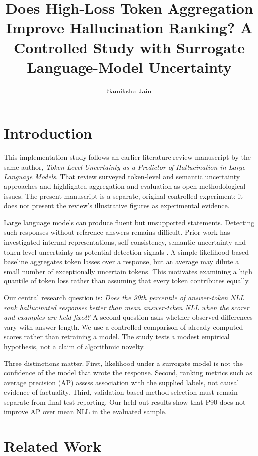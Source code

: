 \documentclass[manuscript,screen]{acmart}
\title{Does High-Loss Token Aggregation Improve Hallucination Ranking? A Controlled Study with Surrogate Language-Model Uncertainty}
\author{Samiksha Jain}
\affiliation{\institution{Indian Institute of Information Technology Allahabad}\department{Department of Information Technology}\city{Prayagraj}\state{Uttar Pradesh}\country{India}}
\begin{document}
\maketitle
\section{Introduction}
This implementation study follows an earlier literature-review manuscript by the same author, \emph{Token-Level Uncertainty as a Predictor of Hallucination in Large Language Models}. That review surveyed token-level and semantic uncertainty approaches and highlighted aggregation and evaluation as open methodological issues. The present manuscript is a separate, original controlled experiment; it does not present the review's illustrative figures as experimental evidence.

Large language models can produce fluent but unsupported statements. Detecting such responses without reference answers remains difficult. Prior work has investigated internal representations, self-consistency, semantic uncertainty and token-level uncertainty as potential detection signals \cite{azaria2023,chen2024,farquhar2024,fadeeva2024}. A simple likelihood-based baseline aggregates token losses over a response, but an average may dilute a small number of exceptionally uncertain tokens. This motivates examining a high quantile of token loss rather than assuming that every token contributes equally.

Our central research question is: \emph{Does the 90th percentile of answer-token NLL rank hallucinated responses better than mean answer-token NLL when the scorer and examples are held fixed?} A second question asks whether observed differences vary with answer length. We use a controlled comparison of already computed scores rather than retraining a model. The study tests a modest empirical hypothesis, not a claim of algorithmic novelty.

Three distinctions matter. First, likelihood under a surrogate model is not the confidence of the model that wrote the response. Second, ranking metrics such as average precision (AP) assess association with the supplied labels, not causal evidence of factuality. Third, validation-based method selection must remain separate from final test reporting. Our held-out results show that P90 does not improve AP over mean NLL in the evaluated sample.

\section{Related Work}
\end{document}
